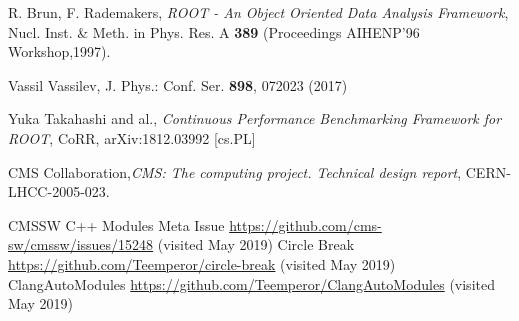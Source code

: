 \documentclass[12pt]{iopart}
\begin{document}
\begin{thebibliography}{10}

R. Brun, F. Rademakers, \textit{ROOT - An Object Oriented Data Analysis Framework}, Nucl. Inst. \& Meth. in Phys. Res. A  \textbf{389} (Proceedings AIHENP'96 Workshop,1997).

Vassil Vassilev, J. Phys.: Conf. Ser. \textbf{898}, 072023 (2017)

Yuka Takahashi and al., \textit{Continuous Performance Benchmarking Framework for ROOT}, CoRR, arXiv:1812.03992 [cs.PL]

CMS Collaboration,\textit{CMS: The computing project. Technical design report}, CERN-LHCC-2005-023.


CMSSW C++ Modules Meta Issue \url{https://github.com/cms-sw/cmssw/issues/15248} (visited May 2019)
Circle Break \url{https://github.com/Teemperor/circle-break} (visited May 2019)
ClangAutoModules \url{https://github.com/Teemperor/ClangAutoModules} (visited May 2019)
\end{thebibliography}
\end{document}
